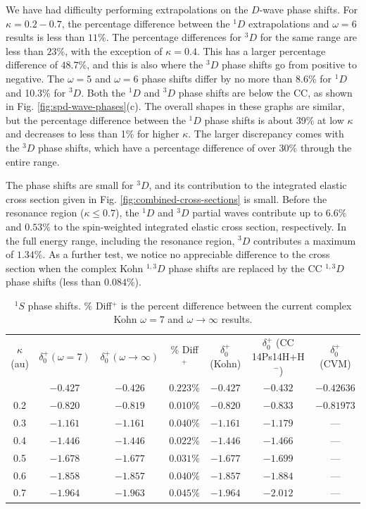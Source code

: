 \documentclass[preprint,showpacs,showkeys,preprintnumbers,amsmath,amssymb,longbibliography,pra,aps]{revtex4-1}
\begin{document}
We have had difficulty performing extrapolations on the $D$-wave phase shifts. 
For $\kappa = 0.2 - 0.7$, the percentage difference between the $^1D$ 
extrapolations and $\omega = 6$ results is less than $11\%$. The percentage 
differences for $^3D$ for the same range are less than $23\%$, with the 
exception of $\kappa = 0.4$. This has a larger percentage difference of $48.7
\%$, and this is also where the $^3D$ phase shifts go from positive to 
negative. The
$\omega = 5$ and $\omega = 6$ phase shifts differ by no more than 8.6\% for
$^1D$ and 10.3\% for $^3D$. Both the $^1D$ and $^3D$ phase shifts are below the 
CC, as shown in Fig. \ref{fig:spd-wave-phases}(c). The overall shapes in these
graphs are similar, but the percentage difference between the $^1D$ phase
shifts is about 39\% at low $\kappa$ and decreases to less than 1\% for
higher $\kappa$. The larger discrepancy comes with the $^3D$ phase shifts,
which have a percentage difference of over 30\% through the entire range.

The phase shifts are small for $^3D$, and its contribution to the integrated 
elastic cross section given in Fig. \ref{fig:combined-cross-sections} is 
small. Before the resonance region ($\kappa \leq 0.7$), the $^1D$ and $^3D$ 
partial waves contribute up to $6.6\%$ and $0.53\%$ to the spin-weighted 
integrated elastic cross section, respectively. In the full energy range, 
including the resonance region, $^3D$ contributes a maximum of $1.34\%$. 
As a further test, we notice no appreciable difference to the cross section 
when the complex Kohn $^{1,3}D$ phase shifts are replaced by the CC
$^{1,3}D$ phase shifts (less than $0.084\%$).

\begin{table}
\centering
\begin{ruledtabular}
\begin{tabular}{c c c c c c c}
$\kappa$ (au) & $\delta_0^+ (\omega = 7)$ & $\delta_0^+ (\omega \rightarrow \infty)$ & \% Diff$^+$ & $\delta_0^+$ (Kohn) \cite{VanReeth2003} & $\delta_0^+$ (CC 14Ps14H+H$^-$) \cite{Walters2004} & $\delta_0^+$ (CVM) \cite{Zhang2012} \\
\colrule
0.1 & $-0.427$ & $-0.426$ & $0.223\%$ & $-0.427$ & $-0.432$ & $-0.42636$ \\
0.2 & $-0.820$ & $-0.819$ & $0.010\%$ & $-0.820$ & $-0.833$ & $-0.81973$ \\
0.3 & $-1.161$ & $-1.161$ & $0.040\%$ & $-1.161$ & $-1.179$ & --- \\
0.4 & $-1.446$ & $-1.446$ & $0.022\%$ & $-1.446$ & $-1.466$ & --- \\
0.5 & $-1.678$ & $-1.677$ & $0.031\%$ & $-1.677$ & $-1.699$ & --- \\
0.6 & $-1.858$ & $-1.857$ & $0.040\%$ & $-1.857$ & $-1.884$ & --- \\
0.7 & $-1.964$ & $-1.963$ & $0.045\%$ & $-1.964$ & $-2.012$ & --- \\
\end{tabular}
\end{ruledtabular}
\caption{$^1S$ phase shifts. \% Diff$^+$ is the percent difference between the
 current complex Kohn $\omega = 7$ and $\omega \rightarrow \infty$ results.}
\label{tab:SWaveSingletPhase}
\end{table}
\end{document}
